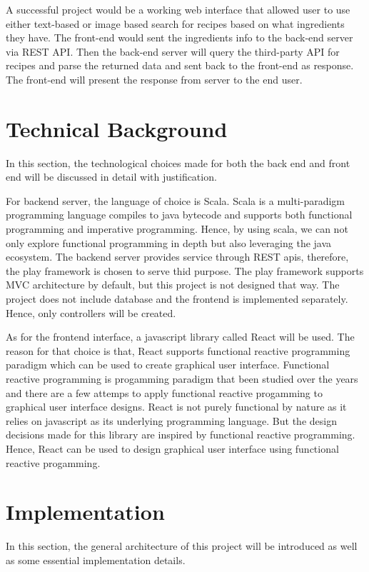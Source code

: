 \documentclass{article}
\begin{document}
\begin{normalsize}
  A successful project would be a working web interface that allowed user to use
  either text-based or image based search for recipes based on what ingredients
  they have. The front-end would sent the ingredients info to the back-end
  server via REST API. Then the back-end server will query the third-party API
  for recipes and parse the returned data and sent back to the front-end as
  response. The front-end will present the response from server to the end user. 


  \section{Technical Background}
  In this section, the technological choices made for both the back end and
  front end will be discussed in detail with justification.

  For backend server, the language of choice is Scala. Scala is a multi-paradigm
  programming language compiles to java bytecode and supports both functional
  programming and imperative programming. Hence, by using scala, we can not only
  explore functional programming in depth but also leveraging the java
  ecosystem. The backend server provides service through REST apis, therefore,
  the play framework is chosen to serve thid purpose. The play framework
  supports MVC architecture by default, but this project is not designed that
  way. The project does not include database and the frontend is implemented
  separately. Hence, only controllers will be created.

  As for the frontend interface, a javascript library called React will be used.
  The reason for that choice is that, React supports functional reactive
  programming paradigm which can be used to create graphical user interface.
  Functional reactive programming is progamming paradigm that been studied over
  the years and there are a few attemps to apply functional reactive progamming
  to graphical user interface designs. React is not purely functional by nature
  as it relies on javascript as its underlying programming language. But the
  design decisions made for this library are inspired by functional reactive
  programming. Hence, React can be used to design graphical user interface using
  functional reactive progamming.
  
  \section{Implementation}
  In this section, the general architecture of this project will be introduced
  as well as some essential implementation details.


\end{normalsize}
\end{document}
